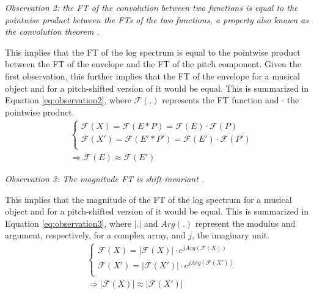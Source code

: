 \documentclass[journal]{IEEEtran}
\begin{document}
\emph{Observation 2: the FT of the convolution between two functions is equal to the pointwise product between the FTs of the two functions, a property also known as the convolution theorem \cite{proakis1995}.}

This implies that the FT of the log spectrum is equal to the pointwise product between the FT of the envelope and the FT of the pitch component. Given the first observation, this further implies that the FT of the envelope for a musical object and for a pitch-shifted version of it would be equal. This is summarized in Equation \ref{eq:observation2}, where $\mathcal{F}(.)$ represents the FT function and $\cdot$ the pointwise product.
\begin{equation}
\label{eq:observation2}
\begin{split}
& \begin{cases}
\mathcal{F}(X) = \mathcal{F}(E * P) = \mathcal{F}(E) \cdot \mathcal{F}(P) \\
\mathcal{F}(X') = \mathcal{F}(E' * P') = \mathcal{F}(E') \cdot \mathcal{F}(P') \\
\end{cases} \\
& \Rightarrow \mathcal{F}(E) \approx \mathcal{F}(E')
\end{split}
\end{equation}

\emph{Observation 3: The magnitude FT is shift-invariant \cite{proakis1995}.}

This implies that the magnitude of the FT of the log spectrum for a musical object and for a pitch-shifted version of it would be equal. This is summarized in Equation \ref{eq:observation3}, where $|.|$ and $Arg(.)$ represent the modulus and argument, respectively, for a complex array, and $j$, the imaginary unit.
\begin{equation}
\label{eq:observation3}
\begin{split}
& \begin{cases}
\mathcal{F}(X) = |\mathcal{F}(X)| \cdot e^{j Arg(\mathcal{F}(X))} \\
\mathcal{F}(X') = |\mathcal{F}(X')| \cdot e^{j Arg(\mathcal{F}(X'))} \\
\end{cases} \\
& \Rightarrow |\mathcal{F}(X)| \approx |\mathcal{F}(X')|
\end{split}
\end{equation}
\end{document}

